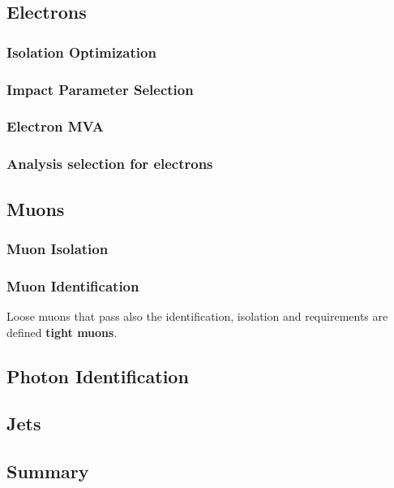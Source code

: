 \subsection{Electrons}
\subsubsection{Isolation Optimization}
\label{sec:eleiso}

\subsubsection{Impact Parameter Selection}
\label{sec:eleSIP}

\subsubsection{Electron MVA}
\label{sec:eleMVA}

\subsubsection{Analysis selection for electrons}%
\label{sec:ele_selection}


\subsection{Muons}
\subsubsection{Muon Isolation}
\label{sec:muoniso}

\subsubsection{Muon Identification}


Loose muons that pass also the identification, isolation and \SIPthreeD requirements are defined \textbf{tight muons}.

\subsection{Photon Identification}
\label{sec:photonID}


\subsection{Jets}

\subsection{Summary}


